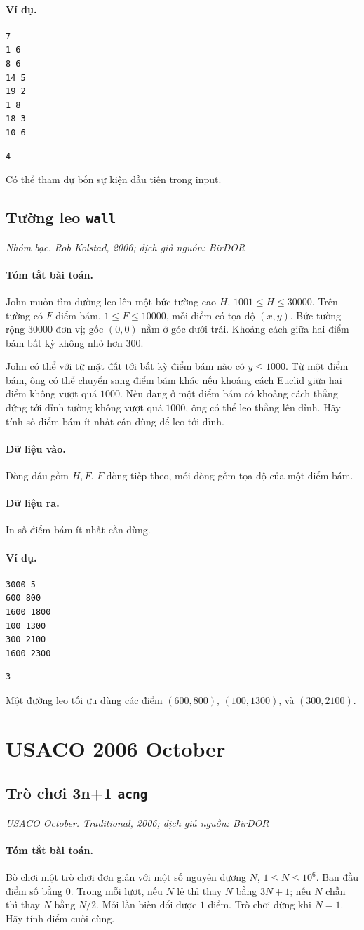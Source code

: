 \documentclass[11pt]{article}
\newcommand{\problem}[4]{%
  \subsection[#1 (#2)]{#1 \hfill {\normalsize\texttt{#2}}}%
  \noindent\textit{#3. #4}\par\smallskip
}
\newcommand{\iosec}[1]{\paragraph{#1}}
\begin{document}
\iosec{Ví dụ.}
\begin{verbatim}
7
1 6
8 6
14 5
19 2
1 8
18 3
10 6
\end{verbatim}

\begin{verbatim}
4
\end{verbatim}

Có thể tham dự bốn sự kiện đầu tiên trong input.

\problem{Tường leo}{wall}{Nhóm bạc}{Rob Kolstad, 2006; dịch giả nguồn: BirDOR}

\iosec{Tóm tắt bài toán.}
John muốn tìm đường leo lên một bức tường cao \(H\), \(1001\le H\le 30000\).
Trên tường có \(F\) điểm bám, \(1\le F\le 10000\), mỗi điểm có tọa độ
\((x,y)\). Bức tường rộng \(30000\) đơn vị; gốc \((0,0)\) nằm ở góc dưới
trái. Khoảng cách giữa hai điểm bám bất kỳ không nhỏ hơn \(300\).

John có thể với từ mặt đất tới bất kỳ điểm bám nào có \(y\le 1000\). Từ một
điểm bám, ông có thể chuyển sang điểm bám khác nếu khoảng cách Euclid giữa
hai điểm không vượt quá \(1000\). Nếu đang ở một điểm bám có khoảng cách thẳng
đứng tới đỉnh tường không vượt quá \(1000\), ông có thể leo thẳng lên đỉnh.
Hãy tính số điểm bám ít nhất cần dùng để leo tới đỉnh.

\iosec{Dữ liệu vào.}
Dòng đầu gồm \(H,F\). \(F\) dòng tiếp theo, mỗi dòng gồm tọa độ của một điểm
bám.

\iosec{Dữ liệu ra.}
In số điểm bám ít nhất cần dùng.

\iosec{Ví dụ.}
\begin{verbatim}
3000 5
600 800
1600 1800
100 1300
300 2100
1600 2300
\end{verbatim}

\begin{verbatim}
3
\end{verbatim}

Một đường leo tối ưu dùng các điểm \((600,800)\), \((100,1300)\), và
\((300,2100)\).

\section{USACO 2006 October}

\problem{Trò chơi 3n+1}{acng}{USACO October}{Traditional, 2006; dịch giả nguồn: BirDOR}

\iosec{Tóm tắt bài toán.}
Bò chơi một trò chơi đơn giản với một số nguyên dương \(N\),
\(1\le N\le 10^6\). Ban đầu điểm số bằng \(0\). Trong mỗi lượt, nếu \(N\) lẻ
thì thay \(N\) bằng \(3N+1\); nếu \(N\) chẵn thì thay \(N\) bằng \(N/2\).
Mỗi lần biến đổi được \(1\) điểm. Trò chơi dừng khi \(N=1\). Hãy tính điểm
cuối cùng.
\end{document}
